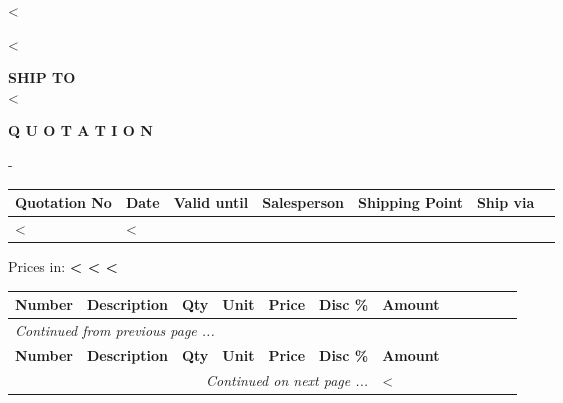 <%

\begin{CJK}{UTF8}{arialuni}

\vspace*{-3.3cm}
<%
\vspace*{0.5cm}

\parbox[t]{.80\textwidth}{
\textbf{SHIP TO} \\
<%
}

\vspace{1.2cm}

\centerline{\large\bf{Q U O T A T I O N}}
\normalsize

\vspace{0.5cm}
-
\vspace{0.2cm}

\begin{tabularx}{\textwidth}{*{7}{|X}|} \hline
  \textbf{Quotation No} & \textbf{Date} & \textbf{Valid until} & \textbf{Salesperson}
  & \textbf{Shipping Point} & \textbf{Ship via} \\ [0.5em]
  \hline
  <%
  & <%
  \hline
\end{tabularx}

\vspace{0.5cm}
	Prices in: \textbf{<%
<%
<%
}
\vspace{0.5cm}

\begin{longtable}{|lp{5.5cm} @{\extracolsep\fill} rrrcl|} \hline
  \textbf{Number} & \textbf{Description} & \textbf{Qty} & 
  \textbf{Unit} & \textbf{Price} & \textbf{Disc \%} & \textbf{Amount}\\ [0.5em]     
  \hline
\endfirsthead
  \multicolumn{6}{l}{\emph{Continued from previous page ...}} \\
  \hline
  \textbf{Number} & \textbf{Description} & \textbf{Qty} & 
  \textbf{Unit} & \textbf{Price} & \textbf{Disc \%} & \textbf{Amount}\\ [0.5em]     
  \hline
\endhead
   \hline \multicolumn{6}{r}{\emph{Continued on next page ...}}
\endfoot
   \hline
   \multicolumn{6}{|r} \textbf{Total} & <%


\end{longtable}
\end{CJK}
